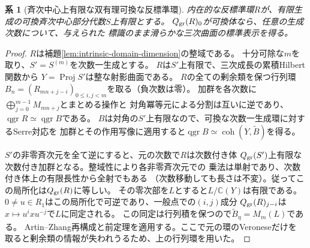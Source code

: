 \documentclass[11pt,a4paper]{ltjsarticle}
\newtheorem{corollary}[theorem]{系}
\theoremstyle{definition}
\newcommand{\qgr}{\operatorname{qgr}}
\newcommand{\coh}{\operatorname{coh}}
\begin{document}
\begin{corollary}[斉次中心上有限な双有理可換な反標準環]
\label{cor:ou-finite-central-birational-recognition}
内在的な反標準環$R$が、有限生成の可換斉次中心部分代数$S$上有限とする。
$Q_{\rm gr}(R)_0$が可換体なら、任意の生成次数について、与えられた
標識のまま滑らかな三次曲面の標準表示を得る。
\end{corollary}
\begin{proof}
$R$は補題\ref{lem:intrinsic-domain-dimension}の整域である。
十分可除な$m$を取り、$S'=S^{(m)}$を次数一生成とする。
$R$は$S'$上有限で、三次成長の累積Hilbert関数から
$Y=\operatorname{Proj}S'$は整な射影曲面である。
$R$の全ての剰余類を保つ行列環
$B_n=(R_{mn+j-i})_{0\le i,j<m}$を取る（負次数は零）。
加群を各次数に$\bigoplus_{j=0}^{m-1} M_{mn+j}$とまとめる操作と
対角冪等元による分割は互いに逆であり、$\qgr R\simeq\qgr B$である。
$B$は対角の$S'$上有限なので、可換な次数一生成環に対するSerre対応を
加群とその作用写像に適用すると$\qgr B\simeq\coh(Y,\widetilde B)$を得る。

$S'$の非零斉次元を全て逆にすると、元の次数で$R$は次数付き体
$Q_{\rm gr}(S')$上有限な次数付き加群となる。整域性により各非零斉次元での
乗法は単射であり、次数付き体上の有限長性から全射でもある
（次数移動しても長さは不変）。従ってこの局所化は$Q_{\rm gr}(R)$に等しい。
その零次部を$L$とすると$L/\mathbb C(Y)$は有限である。
$0\ne u\in R_1$はこの局所化で可逆であり、一般点での$(i,j)$成分
$Q_{\rm gr}(R)_{j-i}$は$x\mapsto u^i x u^{-j}$で$L$に同定される。
この同定は行列積を保つので$\widetilde B_\eta=M_m(L)$である。
Artin--Zhang再構成と前定理を適用する。ここで元の環のVeroneseだけを
取ると剰余類の情報が失われうるため、上の行列環を用いた。
\end{proof}
\end{document}
